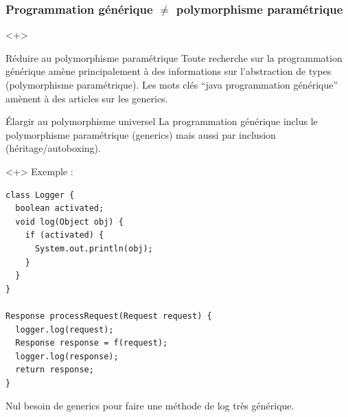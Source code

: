 \documentclass[draft]{beamer}
\begin{document}
\begin{frame}[fragile]
\frametitle{Programmation générique $\neq$ polymorphisme paramétrique}
\begin{onlyenv}<+>
  \begin{alertblock}{Réduire au polymorphisme paramétrique}
    Toute recherche sur la programmation générique amène principalement à des informations sur l'abstraction de types (polymorphisme paramétrique).
    Les mots clés ``java programmation générique'' amènent à des articles sur les generics.
  \end{alertblock}
  \begin{exampleblock}{Élargir au polymorphisme universel}
    La programmation générique inclus le polymorphisme paramétrique (generics) mais aussi par inclusion (héritage/autoboxing).
  \end{exampleblock}
\end{onlyenv}
\begin{onlyenv}<+>
  Exemple :
  \begin{lstlisting}
class Logger {
  boolean activated;
  void log(Object obj) {
    if (activated) {
      System.out.println(obj);
    }
  }
}

Response processRequest(Request request) {
  logger.log(request);
  Response response = f(request);
  logger.log(response);
  return response;
}
  \end{lstlisting}
  Nul besoin de generics pour faire une méthode de log très générique.
\end{onlyenv}
\end{frame}
\end{document}
